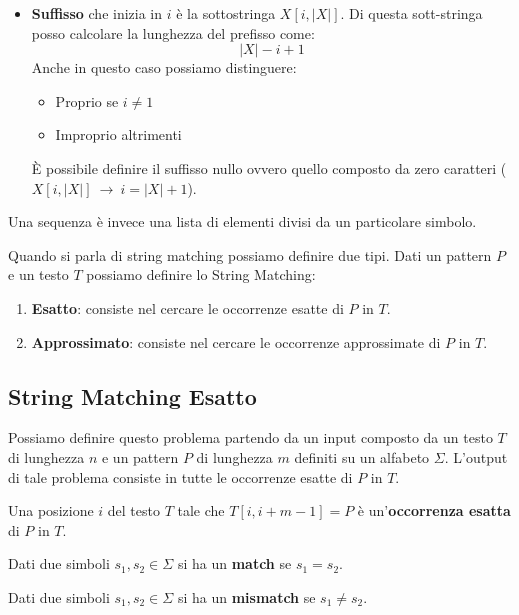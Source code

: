 \begin{definizione}
\begin{itemize}
        \item \textbf{Suffisso} che inizia in $i$ è la sottostringa $X[i,|X|]$. Di questa sott-stringa posso calcolare la lunghezza del prefisso come: 
        \begin{equation}
            |X| - i + 1
        \end{equation}
        Anche in questo caso possiamo distinguere:
        \begin{itemize}
            \item Proprio se $i \neq 1$
            \item Improprio altrimenti
        \end{itemize}
        È possibile definire il suffisso nullo ovvero quello composto da zero caratteri ($X[i,|X|] \ \to \ i = |X| + 1$).
    \end{itemize}
\end{definizione}
\begin{nota}
    Una sequenza è invece una lista di elementi divisi da un particolare simbolo.
\end{nota}

Quando si parla di string matching possiamo definire due tipi. Dati un pattern $P$ e un testo $T$ possiamo definire lo String Matching:
\begin{enumerate}
    \item \textbf{Esatto}: consiste nel cercare le occorrenze esatte di $P$ in $T$.
    \item \textbf{Approssimato}: consiste nel cercare le occorrenze approssimate di $P$ in $T$.
\end{enumerate}
\subsection{String Matching Esatto}
Possiamo definire questo problema partendo da un input composto da un testo $T$ di lunghezza $n$ e un pattern $P$ di lunghezza $m$ definiti su un alfabeto $\Sigma$. L'output di tale problema consiste in tutte le occorrenze esatte di $P$ in $T$.
\begin{definizione}
    Una posizione $i$ del testo $T$ tale che $T[i, i + m - 1] = P$ è un'\textbf{occorrenza esatta} di $P$ in $T$.
\end{definizione}
\begin{definizione}
    Dati due simboli $s_1, s_2 \in \Sigma$ si ha un \textbf{match} se $s_1 = s_2$.
\end{definizione}
\begin{definizione}
    Dati due simboli $s_1, s_2 \in \Sigma$ si ha un \textbf{mismatch} se $s_1 \neq s_2$.
\end{definizione}

